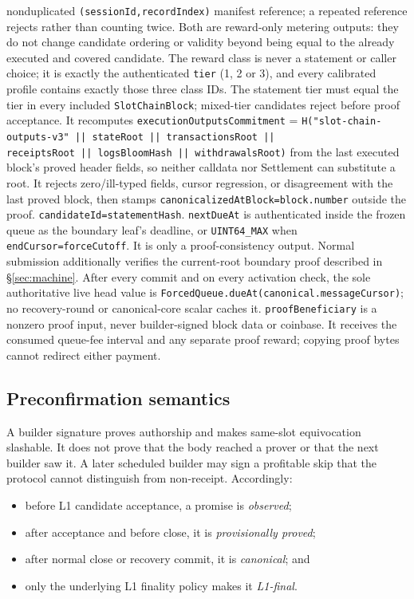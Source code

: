 \documentclass[a4paper,11pt]{article}
\newcommand{\code}[1]{\nolinkurl{#1}}
\begin{document}
nonduplicated \code{(sessionId,recordIndex)} manifest reference; a repeated
reference rejects rather than counting twice.  Both are reward-only metering outputs: they
do not change candidate ordering or validity beyond being equal to the already
executed and covered candidate.  The reward class is never a statement or
caller choice; it is exactly the authenticated \code{tier} (1, 2 or 3), and
every calibrated profile contains exactly those three class IDs.  The statement
tier must equal the tier in every included \code{SlotChainBlock}; mixed-tier
candidates reject before proof acceptance.
It recomputes \code{executionOutputsCommitment} =
\code{H("slot-chain-outputs-v3" || stateRoot || transactionsRoot ||
receiptsRoot || logsBloomHash || withdrawalsRoot)} from the last executed
block's proved header fields, so neither calldata nor Settlement can
substitute a root.
It rejects zero/ill-typed fields, cursor regression, or disagreement with the
last proved block, then stamps \code{canonicalizedAtBlock=block.number} outside
the proof.  \code{candidateId=statementHash}.  \code{nextDueAt} is authenticated
inside the frozen queue as the boundary leaf's deadline, or \code{UINT64_MAX}
when \code{endCursor=forceCutoff}.  It is only a proof-consistency output.
Normal submission additionally verifies the current-root boundary proof
described in \S\ref{sec:machine}.  After every commit and on every activation
check, the sole authoritative live head value is
\code{ForcedQueue.dueAt(canonical.messageCursor)}; no recovery-round or
canonical-core scalar caches it.
\code{proofBeneficiary} is a nonzero proof input, never builder-signed block
data or coinbase.  It receives the consumed queue-fee interval and any separate
proof reward; copying proof bytes cannot redirect either payment.

\subsection{Preconfirmation semantics}

A builder signature proves authorship and makes same-slot equivocation
slashable.  It does not prove that the body reached a prover or that the next
builder saw it.  A later scheduled builder may sign a profitable skip that the
protocol cannot distinguish from non-receipt.  Accordingly:

\begin{itemize}
\item before L1 candidate acceptance, a promise is \emph{observed};
\item after acceptance and before close, it is \emph{provisionally proved};
\item after normal close or recovery commit, it is \emph{canonical}; and
\item only the underlying L1 finality policy makes it \emph{L1-final}.
\end{itemize}
\end{document}
